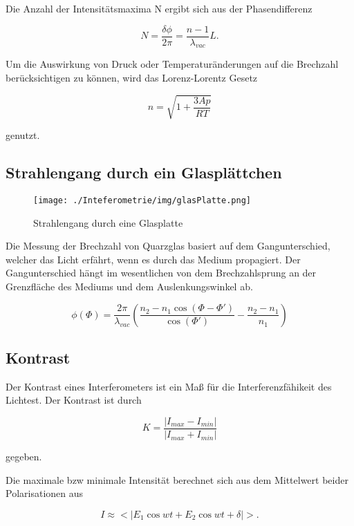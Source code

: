 Die Anzahl der Intensitätsmaxima N ergibt sich aus der Phasendifferenz

\begin{equation}
N=\frac{\delta \phi}{2 \pi} = \frac{n-1}{\lambda_{vac}} L.
\end{equation}

Um die Auswirkung von Druck oder Temperaturänderungen auf die Brechzahl berücksichtigen zu können, wird das Lorenz-Lorentz Gesetz

\begin{equation}
	n = \sqrt{1 + \frac{3Ap}{RT}}
\end{equation}

genutzt.

\subsection{Strahlengang durch ein Glasplättchen}

\begin{figure}[h]
\centering
\texttt{[image: ./Inteferometrie/img/glasPlatte.png]}
\caption{Strahlengang durch eine Glasplatte}
\label{Glasplatte}
\end{figure}

Die Messung der Brechzahl von Quarzglas basiert auf dem Gangunterschied, welcher das Licht erfährt, wenn es durch das Medium propagiert.
Der Gangunterschied hängt im wesentlichen von dem Brechzahlsprung an der Grenzfläche des Mediums und dem Auslenkungswinkel ab.

\begin{equation}
\phi(\Phi) = \frac{2 \pi}{\lambda_{vac}} \left( \frac{n_2 - n_1 \cos(\Phi - \Phi')}{\cos(\Phi')} - \frac{n_2 - n_1}{n_1}\right)
\end{equation}

\subsection{Kontrast}
Der Kontrast eines Interferometers ist ein Maß für die Interferenzfähikeit des Lichtest. Der Kontrast ist durch

\begin{equation}
K = \frac{|I_{max} - I_{min}|}{|I_{max} + I_{min}|}
\end{equation}

gegeben.

Die maximale bzw minimale Intensität berechnet sich aus dem Mittelwert beider Polarisationen aus

\begin{equation}
I \approx  <|E_1 \cos{wt} + E_2 \cos{wt + \delta} |>.
\end{equation}

